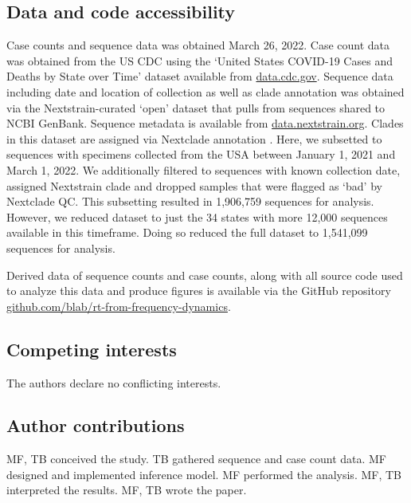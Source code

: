 \subsection*{Data and code accessibility}

Case counts and sequence data was obtained March 26, 2022.
Case count data was obtained from the US CDC using the `United States COVID-19 Cases and Deaths by State over Time' dataset available from \href{https://data.cdc.gov/Case-Surveillance/United-States-COVID-19-Cases-and-Deaths-by-State-o/9mfq-cb36}{data.cdc.gov}.
Sequence data including date and location of collection as well as clade annotation was obtained via the Nextstrain-curated `open' dataset \cite{Hadfield2018} that pulls from sequences shared to NCBI GenBank.
Sequence metadata is available from \href{https://docs.nextstrain.org/projects/ncov/en/latest/reference/remote_inputs.html}{data.nextstrain.org}.
Clades in this dataset are assigned via Nextclade annotation \cite{aksamentov2021nextclade}.
Here, we subsetted to sequences with specimens collected from the USA between January 1, 2021 and March 1, 2022.
We additionally filtered to sequences with known collection date, assigned Nextstrain clade and dropped samples that were flagged as `bad' by Nextclade QC.
This subsetting resulted in 1,906,759 sequences for analysis.
However, we reduced dataset to just the 34 states with more 12,000 sequences available in this timeframe.
Doing so reduced the full dataset to 1,541,099 sequences for analysis.


Derived data of sequence counts and case counts, along with all source code used to analyze this data and produce figures is available via the GitHub repository \href{https://github.com/blab/rt-from-frequency-dynamics/}{github.com/blab/rt-from-frequency-dynamics}.

\subsection*{Competing interests}%

The authors declare no conflicting interests.

\subsection*{Author contributions}

MF, TB conceived the study.
TB gathered sequence and case count data.
MF designed and implemented inference model.
MF performed the analysis.
MF, TB interpreted the results.
MF, TB wrote the paper.

